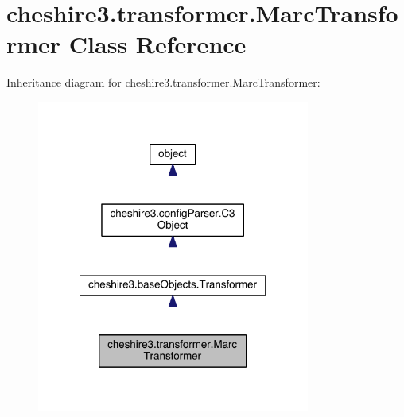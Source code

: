 \hypertarget{classcheshire3_1_1transformer_1_1_marc_transformer}{\section{cheshire3.\-transformer.\-Marc\-Transformer Class Reference}
\label{classcheshire3_1_1transformer_1_1_marc_transformer}
}


Inheritance diagram for cheshire3.\-transformer.\-Marc\-Transformer\-:
\nopagebreak
\begin{figure}[H]
\begin{center}
\leavevmode
\includegraphics[width=254pt]{classcheshire3_1_1transformer_1_1_marc_transformer__inherit__graph}
\end{center}
\end{figure}


